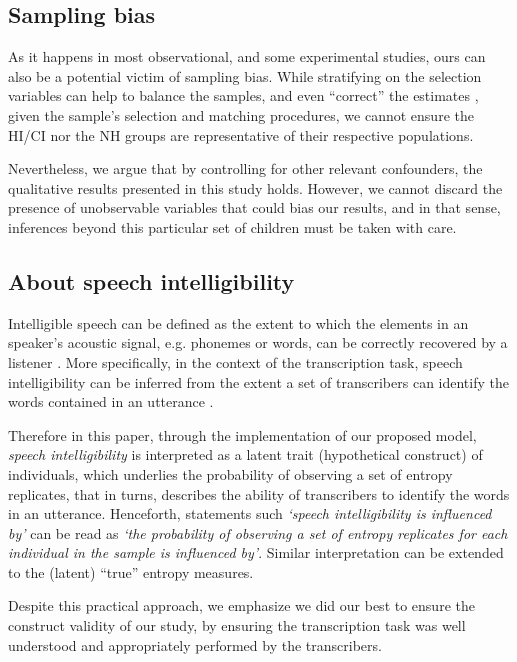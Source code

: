 \subsection{Sampling bias} \label{sSA:sampling_bias}
%
As it happens in most observational, and some experimental studies, ours can also be a potential victim of sampling bias. While stratifying on the selection variables can help to balance the samples, and even ``correct'' the estimates \cite{Cinelli_et_al_2021, Deffner_et_al_2022}, given the sample's selection and matching procedures, we cannot ensure the HI/CI nor the NH groups are representative of their respective populations. 

Nevertheless, we argue that by controlling for other relevant confounders, the qualitative results presented in this study holds. However, we cannot discard the presence of unobservable variables that could bias our results, and in that sense, inferences beyond this particular set of children must be taken with care.
%
%
\subsection{About speech intelligibility} \label{sSA:SI}
%
Intelligible speech can be defined as the extent to which the elements in an speaker's acoustic signal, e.g. phonemes or words, can be correctly recovered by a listener \citep{Kent_et_al_1989, Whitehill_et_al_2004, vanHeuven_2008, Freeman_et_al_2017}. More specifically, in the context of the transcription task, speech intelligibility can be inferred from the extent a set of transcribers can identify the words contained in an utterance \cite{Boonen_et_al_2021}.

Therefore in this paper, through the implementation of our proposed model, \textit{speech intelligibility} is interpreted as a latent trait (hypothetical construct) of individuals, which underlies the probability of observing a set of entropy replicates, that in turns, describes the ability of transcribers to identify the words in an utterance. Henceforth, statements such \textit{`speech intelligibility is influenced by'} can be read as \textit{`the probability of observing a set of entropy replicates for each individual in the sample is influenced by'}. Similar interpretation can be extended to the (latent) ``true'' entropy measures.

Despite this practical approach, we emphasize we did our best to ensure the construct validity of our study, by ensuring the transcription task was well understood and appropriately performed by the transcribers.

